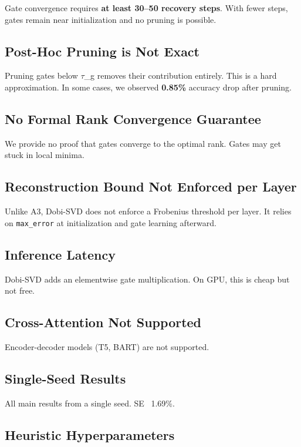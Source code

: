 Gate convergence requires \textbf{at least 30--50 recovery steps}. With fewer 
steps, gates remain near initialization and no pruning is possible.

\subsection{Post-Hoc Pruning is Not Exact}

Pruning gates below $\tau$\_g removes their contribution entirely. This is a 
hard approximation. In some cases, we observed \textbf{0.85\%} accuracy 
drop after pruning.

\subsection{No Formal Rank Convergence Guarantee}

We provide no proof that gates converge to the optimal rank. Gates may 
get stuck in local minima.

\subsection{Reconstruction Bound Not Enforced per Layer}

Unlike A3, Dobi-SVD does not enforce a Frobenius threshold per layer. It 
relies on \texttt{max\_error} at initialization and gate learning afterward.

\subsection{Inference Latency}

Dobi-SVD adds an elementwise gate multiplication. On GPU, this is cheap 
but not free.

\subsection{Cross-Attention Not Supported}

Encoder-decoder models (T5, BART) are not supported.

\subsection{Single-Seed Results}

All main results from a single seed. SE ~1.69\%.

\subsection{Heuristic Hyperparameters}


